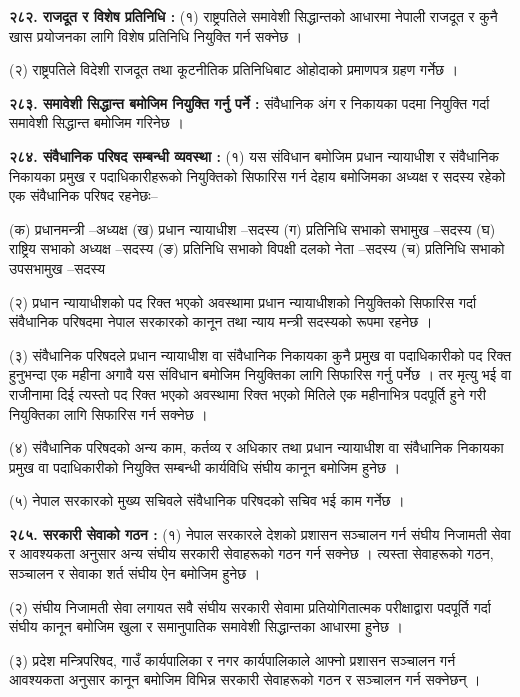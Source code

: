 \textbf{२८२. राजदूत र विशेष प्रतिनिधि :} (१) राष्ट्रपतिले समावेशी सिद्धान्तको आधारमा नेपाली राजदूत र कुनै खास प्रयोजनका लागि विशेष प्रतिनिधि नियुक्ति गर्न सक्नेछ ।

(२) राष्ट्रपतिले विदेशी राजदूत तथा कूटनीतिक प्रतिनिधिबाट ओहोदाको प्रमाणपत्र ग्रहण गर्नेछ ।

\textbf{२८३. समावेशी सिद्धान्त बमोजिम नियुक्ति गर्नु पर्ने :} संवैधानिक अंग र निकायका पदमा नियुक्ति गर्दा समावेशी सिद्धान्त बमोजिम गरिनेछ ।

\textbf{२८४. संवैधानिक परिषद सम्बन्धी व्यवस्था :} (१) यस संविधान बमोजिम प्रधान न्यायाधीश र संवैधानिक निकायका प्रमुख र पदाधिकारीहरूको नियुक्तिको सिफारिस गर्न देहाय बमोजिमका अध्यक्ष र सदस्य रहेको एक संवैधानिक परिषद रहनेछः–

(क) प्रधानमन्त्री –अध्यक्ष
(ख) प्रधान न्यायाधीश –सदस्य
(ग) प्रतिनिधि सभाको सभामुख –सदस्य
(घ) राष्ट्रिय सभाको अध्यक्ष –सदस्य
(ङ) प्रतिनिधि सभाको विपक्षी दलको नेता –सदस्य
(च) प्रतिनिधि सभाको उपसभामुख –सदस्य

(२) प्रधान न्यायाधीशको पद रिक्त भएको अवस्थामा प्रधान न्यायाधीशको नियुक्तिको सिफारिस गर्दा संवैधानिक परिषदमा नेपाल सरकारको कानून तथा न्याय मन्त्री सदस्यको रूपमा रहनेछ ।

(३) संवैधानिक परिषदले प्रधान न्यायाधीश वा संवैधानिक निकायका कुनै प्रमुख वा पदाधिकारीको पद रिक्त हुनुभन्दा एक महीना अगावै यस संविधान बमोजिम नियुक्तिका लागि सिफारिस गर्नु पर्नेछ ।
तर मृत्यु भई वा राजीनामा दिई त्यस्तो पद रिक्त भएको अवस्थामा रिक्त भएको मितिले एक महीनाभित्र पदपूर्ति हुने गरी नियुक्तिका लागि सिफारिस गर्न सक्नेछ ।

(४) संवैधानिक परिषदको अन्य काम, कर्तव्य र अधिकार तथा प्रधान न्यायाधीश वा संवैधानिक निकायका प्रमुख वा पदाधिकारीको नियुक्ति सम्बन्धी कार्यविधि संघीय कानून बमोजिम हुनेछ ।

(५) नेपाल सरकारको मुख्य सचिवले संवैधानिक परिषदको सचिव भई काम गर्नेछ ।

\textbf{२८५. सरकारी सेवाको गठन :} (१) नेपाल सरकारले देशको प्रशासन सञ्चालन गर्न संघीय निजामती सेवा र आवश्यकता अनुसार अन्य संघीय सरकारी सेवाहरूको गठन गर्न सक्नेछ । त्यस्ता सेवाहरूको गठन, सञ्चालन र सेवाका शर्त संघीय ऐन बमोजिम हुनेछ ।

(२) संघीय निजामती सेवा लगायत सवै संघीय सरकारी सेवामा प्रतियोगितात्मक परीक्षाद्वारा पदपूर्ति गर्दा संघीय कानून बमोजिम खुला र समानुपातिक समावेशी सिद्धान्तका आधारमा हुनेछ ।

(३) प्रदेश मन्त्रिपरिषद, गाउँ कार्यपालिका र नगर कार्यपालिकाले आफ्नो प्रशासन सञ्चालन गर्न आवश्यकता अनुसार कानून बमोजिम विभिन्न सरकारी सेवाहरूको गठन र सञ्चालन गर्न सक्नेछन् ।

